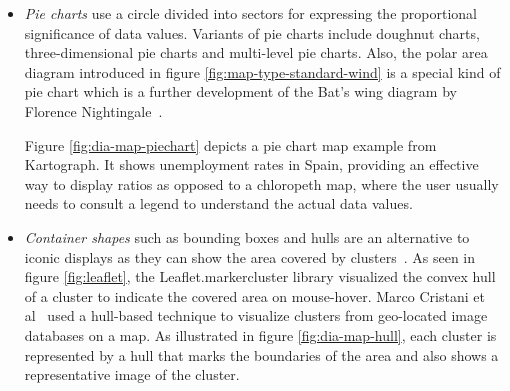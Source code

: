 \begin{itemize}
\begin{itemize}
{    
    \label{fig:dia-map-barchart}
}


\item \textit{Pie charts} use a circle divided into sectors for expressing the proportional significance of data values. Variants of pie charts include doughnut charts, three-dimensional pie charts and multi-level pie charts. Also, the polar area diagram introduced in figure \ref{fig:map-type-standard-wind} is a special kind of pie chart which is a further development of the Bat's wing diagram by Florence Nightingale~\cite{night98bart}.

Figure \ref{fig:dia-map-piechart} depicts a pie chart map example from Kartograph. It shows unemployment rates in Spain, providing an effective way to display ratios as opposed to a chloropeth map, where the user usually needs to consult a legend to understand the actual data values.

\item \textit{Container shapes} such as bounding boxes and hulls are an alternative to iconic displays as they can show the area covered by clusters~\cite{Delort10vis}. As seen in figure \ref{fig:leaflet}, the Leaflet.markercluster library visualized the convex hull of a cluster to indicate the covered area on mouse-hover. Marco Cristani et al~\cite{Cristani08geoimagemaps} used a hull-based technique to visualize clusters from geo-located image databases on a map. As illustrated in figure \ref{fig:dia-map-hull}, each cluster is represented by a hull that marks the boundaries of the area and also shows a representative image of the cluster.



\end{itemize}
\end{itemize}
